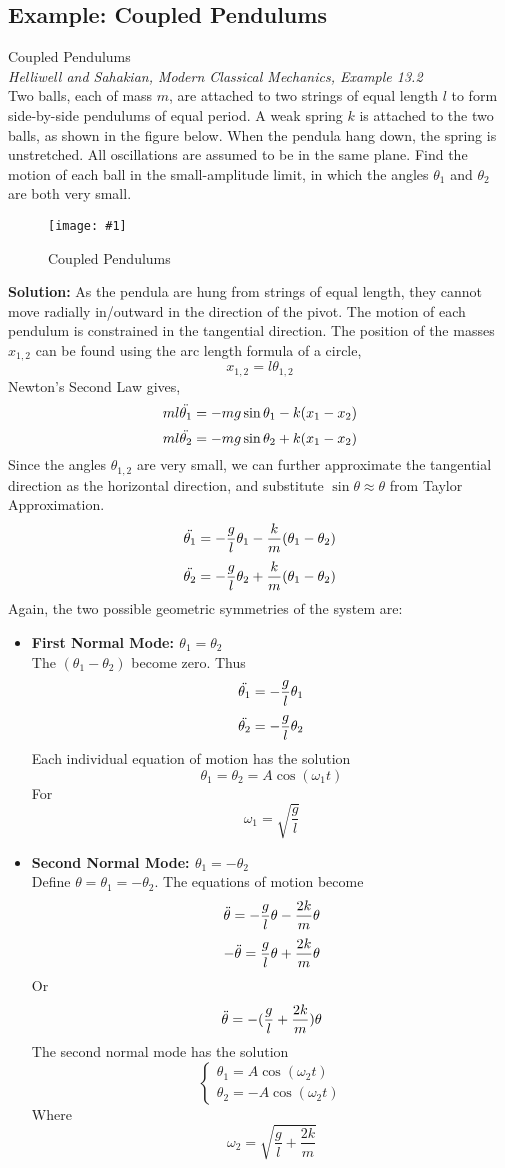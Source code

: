 \documentclass[11pt]{article}
\newcommand{\fig}[4]{
    \begin{figure}[H]
        \centering
        \texttt{[image: \#1]}
        \caption{#2}
        \label{exp4fit}
    \end{figure}
}
\theoremstyle{gangnamstyle}{\newtheorem{definition}{Definition}[]}
\theoremstyle{gangnamstyle}{\newtheorem{example}{Example}[]}
\theoremstyle{gangnamstyle}{\newtheorem{problem}{Problem}[]}
\theoremstyle{gangnamstyle}{\newtheorem{warning}{Warning}[]}
\begin{document}
\subsection{Example: Coupled Pendulums}
\begin{example}
Coupled Pendulums \\
\textit{Helliwell and Sahakian, Modern Classical Mechanics, Example 13.2} \\
Two balls, each of mass $m$, are attached to two strings of equal length $l$ to form side-by-side pendulums of equal period. A weak spring $k$ is attached to the two balls, as shown in the figure below. When the pendula hang down, the spring is unstretched. All oscillations are assumed to be in the same plane. Find the motion of each ball in the small-amplitude limit, in which the angles $\theta_1$ and $\theta_2$ are both very small. 
\fig{figs/n3/pendulum.jpg}{Coupled Pendulums}{0.5}{0}
\textbf{Solution:} As the pendula are hung from strings of equal length, they cannot move radially in/outward in the direction of the pivot. The motion of each pendulum is constrained in the tangential direction. The position of the masses $x_{1, 2}$ can be found using the arc length formula of a circle, 
\[ x_{1, 2} = l\theta_{1, 2} \]
Newton's Second Law gives, 
\[ ml\Ddot{\theta_1} = -mg\sin\theta_1 - k(x_1 - x_2) \]
\[ ml\Ddot{\theta_2} = -mg\sin\theta_2 + k(x_1 - x_2) \]
Since the angles $\theta_{1, 2}$ are very small, we can further approximate the tangential direction as the horizontal direction, and substitute $\sin\theta \approx \theta$ from Taylor Approximation. 
\[ \Ddot{\theta_1} = -\frac{g}{l}\theta_1 - \frac{k}{m}(\theta_1 - \theta_2) \]
\[ \Ddot{\theta_2} = -\frac{g}{l}\theta_2 + \frac{k}{m}(\theta_1 - \theta_2) \]
Again, the two possible geometric symmetries of the system are: 
\begin{itemize}
\item \textbf{First Normal Mode: $\theta_1 = \theta_2$} \\
The $(\theta_1 - \theta_2)$ become zero. Thus
\[ \Ddot{\theta_1} = -\frac{g}{l}\theta_1 \]
\[ \Ddot{\theta_2} = -\frac{g}{l}\theta_2 \]
Each individual equation of motion has the solution
\[ \theta_1 = \theta_2 = A\cos(\omega_1 t) \]
For 
\[ \omega_1 = \sqrt{\frac{g}{l}} \]
\item \textbf{Second Normal Mode: $\theta_1 = - \theta_2$} \\
Define $\theta = \theta_1 = -\theta_2$. The equations of motion become
\[ \Ddot{\theta} = -\frac{g}{l}\theta - \frac{2k}{m}\theta \]
\[ -\Ddot{\theta} = \frac{g}{l}\theta + \frac{2k}{m}\theta \]
Or
\[ \Ddot{\theta} = -(\frac{g}{l} + \frac{2k}{m})\theta \]
The second normal mode has the solution
\[ \begin{cases}
\theta_1 = A\cos(\omega_2 t) \\
\theta_2 = - A\cos(\omega_2 t)
\end{cases} \]
Where
\[ \omega_2 = \sqrt{\frac{g}{l} + \frac{2k}{m}} \]
\end{itemize}
\end{example}
\end{document}
